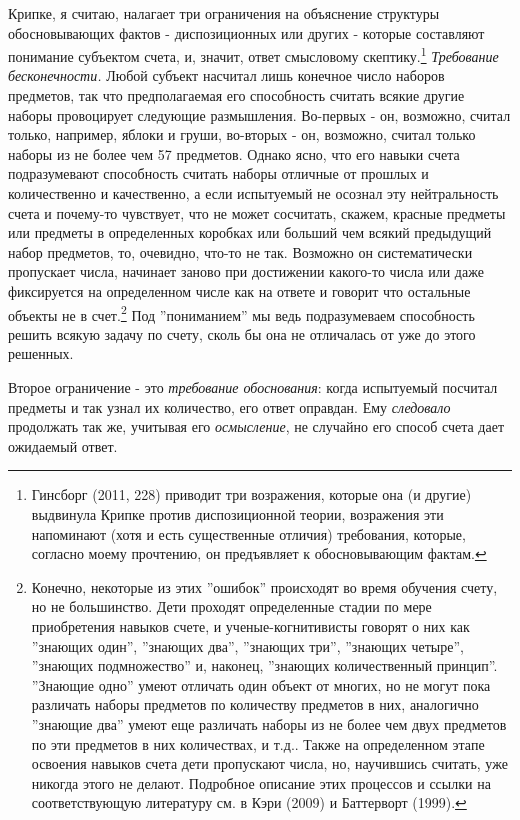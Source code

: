 \documentclass{book}
\begin{document}
Крипке, я считаю, налагает три ограничения на объяснение структуры обосновывающих фактов - диспозиционных или других - которые составляют понимание субъектом счета, и, значит, ответ смысловому скептику.\footnote{Гинсборг (2011, 228) приводит три возражения, которые она (и другие) выдвинула Крипке против диспозиционной теории, возражения эти напоминают (хотя и есть существенные отличия) требования, которые, согласно моему прочтению, он предъявляет к обосновывающим фактам.} \textit{Требование бесконечности.} Любой субъект насчитал лишь конечное число наборов предметов, так что предполагаемая его способность считать всякие другие наборы провоцирует следующие размышления. Во-первых - он, возможно, считал только, например, яблоки и груши, во-вторых - он, возможно, считал только наборы из не более чем 57 предметов. Однако ясно, что его навыки счета подразумевают способность считать наборы отличные от прошлых и количественно и качественно, а если испытуемый не осознал эту нейтральность счета и почему-то чувствует, что не может сосчитать, скажем, красные предметы или предметы в определенных коробках или больший чем всякий предыдущий набор предметов, то, очевидно, что-то не так. Возможно он систематически пропускает числа, начинает заново при достижении какого-то числа или даже фиксируется на определенном числе как на ответе и говорит что остальные объекты не в счет.\footnote{Конечно, некоторые из этих ''ошибок'' происходят во время обучения счету, но не большинство. Дети проходят определенные стадии по мере приобретения навыков счете, и ученые-когнитивисты говорят о них как ''знающих один'', ''знающих два'', ''знающих три'', ''знающих четыре'', ''знающих подмножество'' и, наконец, ''знающих количественный принцип''. ''Знающие одно'' умеют отличать один объект от многих, но не могут пока различать наборы предметов по количеству предметов в них, аналогично ''знающие два'' умеют еще различать наборы из не более чем двух предметов по эти предметов в них количествах, и т.д.. Также на определенном этапе освоения навыков счета дети пропускают числа, но, научившись считать, уже никогда этого не делают. Подробное описание этих процессов и ссылки на соответствующую литературу см. в Кэри (2009) и Баттерворт (1999).} Под ''пониманием'' мы ведь подразумеваем способность решить всякую задачу по счету, сколь бы она не отличалась от уже до этого решенных.

Второе ограничение - это \textit{требование обоснования}: когда испытуемый посчитал предметы и так узнал их количество, его ответ оправдан. Ему \textit{следовало} продолжать так же, учитывая его \textit{осмысление}, не случайно его способ счета дает ожидаемый ответ.
\end{document}
